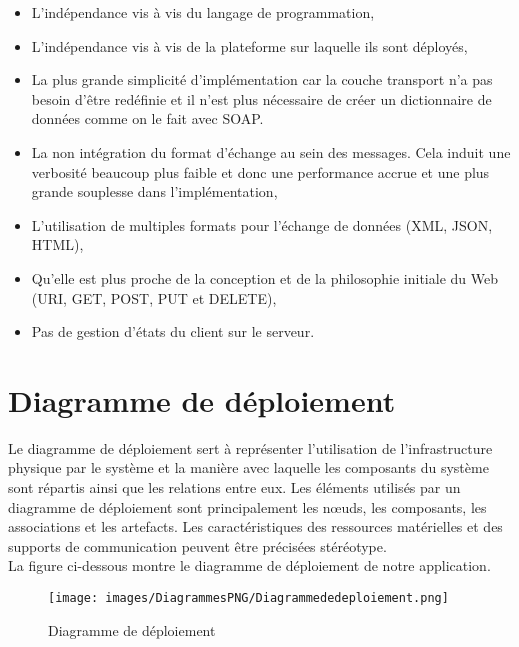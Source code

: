 {\begin{itemize}
\item L'indépendance vis à vis du langage de programmation,
\item L'indépendance vis à vis de la plateforme sur laquelle ils sont déployés,
\item La plus grande simplicité d'implémentation car la couche transport n'a pas besoin d'être redéfinie et il n'est plus nécessaire de créer un dictionnaire de données comme on le fait avec SOAP.
\item La non intégration du format d'échange au sein des messages. Cela induit une verbosité beaucoup plus faible et donc une performance accrue et une plus grande souplesse dans l'implémentation,
\item L'utilisation de multiples formats pour l'échange de données (XML, JSON, HTML),
\item Qu'elle est plus proche de la conception et de la philosophie initiale du Web (URI, GET, POST, PUT et DELETE),
\item Pas de gestion d'états du client sur le serveur.
\end{itemize}

\section{Diagramme de déploiement}
Le diagramme de déploiement sert à représenter l'utilisation de l'infrastructure physique par le système et la manière avec laquelle les composants du système sont répartis ainsi que les relations entre eux. Les éléments utilisés par un diagramme de déploiement sont principalement les nœuds, les composants, les associations et les artefacts. Les caractéristiques des ressources matérielles et des supports de communication peuvent être précisées stéréotype.\\

La figure ci-dessous montre le diagramme de déploiement de notre application.

\begin{figure}[H]
\centering
\texttt{[image: images/DiagrammesPNG/Diagrammededeploiement.png]}
\caption{Diagramme de déploiement}
\end{figure}

}
